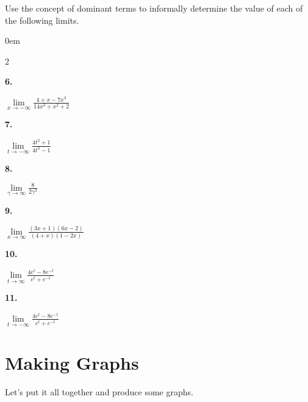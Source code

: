 \documentclass[12pt,]{book}
\theoremstyle{plain}
\theoremstyle{definition}
\numberwithin{equation}{section}
\newenvironment{exercisegroup}%
{\medskip\noindent}%
{\par\bigskip}%
\newlength{\exercisegroupindent}%
\newlength{\exercisegroupitemwidth}%
\newenvironment{exercisegrouplist}%
{\vspace{-\partopsep}%
\begin{adjustwidth}{\exercisegroupindent}{0em}}%
{\end{adjustwidth}%
\vspace{-\partopsep}%
\vspace{\baselineskip}}%
\newenvironment{exercisegroupbycol}[1]%
{\begin{exercisegrouplist}%
\vspace{-\multicolsep}%
\begin{multicols}{#1}%
\setlength{\parindent}{0em}%
\setlength{\exercisegroupitemwidth}{\linewidth}}%
{\end{multicols}%
\vspace{-\multicolsep}%
\end{exercisegrouplist}}%
\newenvironment{exercisegroupitem}[1]%
{\begin{minipage}[t]{\exercisegroupitemwidth}
\vspace{0pt}%
{\bfseries#1}%
\rule{0pt}{\baselineskip}}{\strut%
\end{minipage}%
\hspace{\columnsep}}%
\providecommand\phantomsection{}
\begin{document}
\begin{exercisegroup}%
Use the concept of dominant terms to informally determine the value of each of the following limits.%
\par
\begin{exercisegroupbycol}{2}%
\begin{exercisegroupitem}{6. }\phantomsection\hypertarget{exercise-443}{\null}
\(\lim\limits_{x\to-\infty}\frac{4+x-7x^3}{14x^3+x^2+2}\)%
\end{exercisegroupitem}%
\par%
\begin{exercisegroupitem}{7. }\phantomsection\hypertarget{exercise-444}{\null}
\(\lim\limits_{t\to-\infty}\frac{4t^2+1}{4t^3-1}\)%
\end{exercisegroupitem}%
\par%
\begin{exercisegroupitem}{8. }\phantomsection\hypertarget{exercise-445}{\null}
\(\lim\limits_{\gamma\to\infty}\frac{8}{2\gamma^3}\)%
\end{exercisegroupitem}%
\par%
\begin{exercisegroupitem}{9. }\phantomsection\hypertarget{exercise-446}{\null}
\(\lim\limits_{x\to\infty}\frac{(3x+1)(6x-2)}{(4+x)(1-2x)}\)%
\end{exercisegroupitem}%
\par%
\begin{exercisegroupitem}{10. }\phantomsection\hypertarget{exercise-447}{\null}
\(\lim\limits_{t\to\infty}\frac{4e^t-8e^{-t}}{e^t+e^{-t}}\)%
\end{exercisegroupitem}%
\par%
\begin{exercisegroupitem}{11. }\phantomsection\hypertarget{exercise-448}{\null}
\(\lim\limits_{t\to-\infty}\frac{4e^t-8e^{-t}}{e^t+e^{-t}}\)%
\end{exercisegroupitem}%
\par%
\end{exercisegroupbycol}%
\end{exercisegroup}%
\typeout{************************************************}
\typeout{************************************************}
\section[Making Graphs]{Making Graphs}\label{section-making-graphs}
Let's put it all together and produce some graphs.%
\typeout{************************************************}
\typeout{************************************************}
\end{document}
